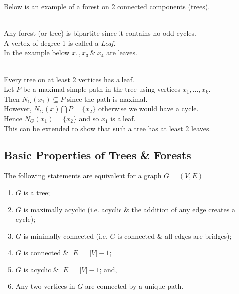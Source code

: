 \documentclass[11pt,a4paper]{article}
\begin{document}
Below is an example of a forest on 2 connected components (trees).\\
\\

Any forest (or tree) is bipartite since it contains no odd cycles.\\

A vertex of degree 1 is called a \textit{Leaf}.\\

In the example below $x_1,x_3\ \&\ x_4$ are leaves.\\
\\

Every tree on at least 2 vertices has a leaf.\\

Let $P$ be a maximal simple path in the tree using vertices $x_1,\dots,x_k$.\\
Then $N_G(x_1)\subseteq P$ since the path is maximal.\\
However, $N_G(x)\bigcap P=\{x_2\}$ otherwise we would have a cycle.\\
Hence $N_G(x_1)=\{x_2\}$ and so $x_1$ is a leaf.\\

This can be extended to show that such a tree has at least 2 leaves.

\subsection{Basic Properties of Trees \& Forests}

The following statements are equivalent for a graph $G=(V,E)$
\begin{enumerate}[label=\roman*)]
	\item $G$ is a tree;
	\item $G$ is maximally acyclic (i.e. acyclic \& the addition of any edge creates a cycle);
	\item $G$ is minimally connected (i.e. $G$ is connected \& all edges are bridges);
	\item $G$ is connected \& $|E|=|V|-1$;
	\item $G$ is acyclic \& $|E|=|V|-1$; and,
	\item Any two vertices in $G$ are connected by a unique path.
\end{enumerate}
\end{document}
